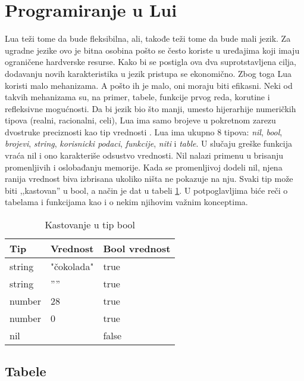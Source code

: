 \documentclass[a4paper]{article}
\begin{document}
\section{Programiranje u Lui}
\label{sec:programiranje}


Lua teži tome da bude fleksibilna, ali, takođe teži tome da bude mali jezik. Za ugradne jezike ovo je bitna osobina pošto se često koriste u uređajima koji imaju ograničene hardverske resurse. Kako bi se postigla ova dva suprotstavljena cilja, dodavanju novih karakteristika u jezik pristupa se ekonomično. Zbog toga Lua koristi malo mehanizama. A pošto ih je malo, oni moraju biti efikasni. Neki od takvih mehanizama su, na primer, tabele, funkcije prvog reda, korutine i refleksivne mogućnosti. Da bi jezik bio što manji, umesto hijerarhije numeričkih tipova (realni, racionalni, celi), Lua ima samo brojeve u pokretnom zarezu dvostruke preciznosti kao tip vrednosti \cite{multiParadigms}.
Lua ima ukupno 8 tipova: \textit{nil}, \textit{bool}, \textit{brojevi}, \textit{string}, \textit{korisnicki podaci}, \textit{funkcije}, \textit{niti} i \textit{table}. U slučaju greške funkcija vraća nil i ono karakteriše odsustvo vrednosti. Nil nalazi primenu u brisanju promenljivih i oslobađanju memorije. Kada se promenljivoj dodeli nil, njena ranija vrednost biva izbrisana ukoliko ništa ne pokazuje na nju. Svaki tip može biti ,,kastovan'' u bool, a način je dat u tabeli \ref{kastovanje}. U potpoglavljima biće reči o tabelama i funkcijama kao i o nekim njihovim važnim konceptima.

\begin{table}[h!]
\begin{center}
\begin{tabular}{|l|l|l|}
\hline
Tip & Vrednost & Bool vrednost \\
\hline
string &  "čokolada" &  true \\
\hline
string  & '''' &  true \\
\hline
number &  28 &  true \\
\hline
number & 0 &  true \\
\hline
nil &   & false \\
\hline 
\end{tabular}
\caption{Kastovanje u tip bool}
\label{kastovanje}
\end{center}
\end{table}

\subsection{Tabele}
\label{sec:tabele}
\end{document}
